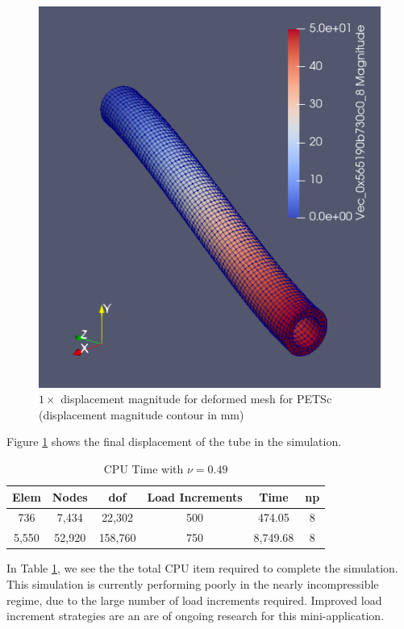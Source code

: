 \begin{figure}[ht]
\begin{center}
\includegraphics[angle=0,width=1\linewidth]{../img/tube27.png}
\end{center}
\caption{$1\times$ displacement magnitude for deformed mesh for PETSc (displacement magnitude contour in mm)}
\label{fig:hyper-press} 
\end{figure}

Figure \ref{fig:hyper-press} shows the final displacement of the tube in the simulation.

\begin{table}[ht!]
\centering
{\small
 \begin{tabular}{c c c c c c} 
 \hline
 Elem & Nodes & dof & Load Increments & Time & np \\ [0.5ex] 
 \hline
736   &  7,434 &  22,302 & 500  &  474.05   & 8\\ 
5,550 & 52,920 & 158,760 & 750  &  8,749.68 & 8\\
 \hline
 \end{tabular}
 }
\caption{CPU Time with $\nu = 0.49$}
 \label{table:hyper-meshSizes}
\end{table}

In Table \ref{table:hyper-meshSizes}, we see the the total CPU item required to complete the simulation.
This simulation is currently performing poorly in the nearly incompressible regime, due to the large number of load increments required.
Improved load increment strategies are an are of ongoing research for this mini-application.
